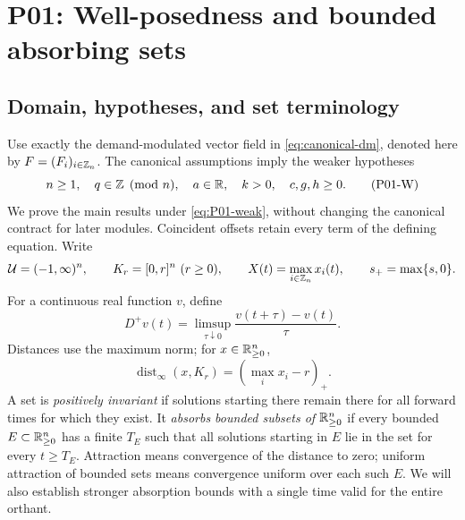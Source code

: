
\section{P01: Well-posedness and bounded absorbing sets}
\label{sec:P01}

\subsection{Domain, hypotheses, and set terminology}
Use exactly the demand-modulated vector field in
\eqref{eq:canonical-dm}, denoted here by $F=(F_i)_{i\in\mathbb{Z}_n}$.
The canonical assumptions imply the weaker hypotheses
\begin{equation}
\label{eq:P01-weak}
 n\ge1,\quad q\in\mathbb{Z}\pmod n,\quad
 a\in\mathbb{R},\quad k>0,\quad c,g,h\ge0.
\tag{P01-W}
\end{equation}
We prove the main results under \eqref{eq:P01-weak}, without changing the
canonical contract for later modules. Coincident offsets retain every
term of the defining equation. Write
\[
 \Domain=(-1,\infty)^n,\qquad K_r=[0,r]^n\ (r\ge0),\qquad
 X(t)=\max_{i\in\Zn}x_i(t),\qquad s_+=\max\{s,0\}.
\]
For a continuous real function $v$, define
\[
 D^+v(t)=\limsup_{\tau\downarrow0}
             \frac{v(t+\tau)-v(t)}{\tau}.
\]
Distances use the maximum norm; for $x\in\mathbb{R}_{\geq 0}^{n}$,
\begin{equation}
\label{eq:P01-distance}
 \operatorname{dist}_\infty(x,K_r)=(\max_i x_i-r)_+.
\end{equation}
A set is \emph{positively invariant} if solutions starting there remain
there for all forward times for which they exist. It \emph{absorbs bounded
subsets of $\mathbb{R}_{\geq 0}^{n}$} if every bounded $E\subset\mathbb{R}_{\geq 0}^{n}$ has a finite $T_E$
such that all solutions starting in $E$ lie in the set for every
$t\ge T_E$. Attraction means convergence of the distance to zero;
uniform attraction of bounded sets means convergence uniform over each
such $E$. We will also establish stronger absorption bounds with a
single time valid for the entire orthant.

